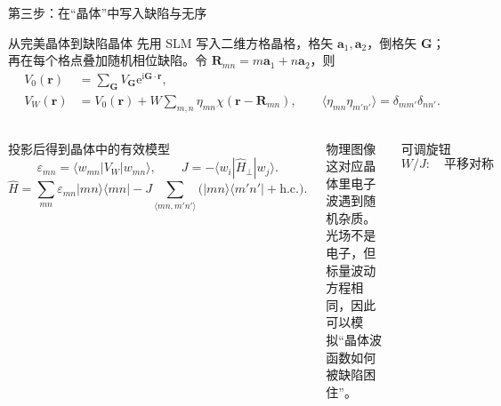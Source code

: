 \documentclass[UTF8,fontset=none,aspectratio=169,10pt]{ctexbeamer}
\newcommand{\ii}{\mathrm{i}}
\newcommand{\ee}{\mathrm{e}}
\newcommand{\rb}{\mathbf{r}}
\newcommand{\ab}{\mathbf{a}}
\newcommand{\Gb}{\mathbf{G}}
\newcommand{\Rn}{\mathbf{R}_{mn}}
\begin{document}
\begin{frame}[t]{第三步：在“晶体”中写入缺陷与无序}
\footnotesize
\setlength{\abovedisplayskip}{3pt}
\setlength{\belowdisplayskip}{3pt}
\begin{block}{从完美晶体到缺陷晶体}
先用 SLM 写入二维方格晶格，格矢 $\ab_1,\ab_2$，倒格矢 $\Gb$；再在每个格点叠加随机相位缺陷。令 $\Rn=m\ab_1+n\ab_2$，则
\[
\begin{aligned}
V_0(\rb)&=\sum_{\Gb}V_{\Gb}\ee^{\ii\Gb\cdot\rb},\\
V_W(\rb)&=V_0(\rb)+
W\sum_{m,n}\eta_{mn}\chi(\rb-\Rn),\qquad
\langle\eta_{mn}\eta_{m'n'}\rangle=\delta_{mm'}\delta_{nn'} .
\end{aligned}
\]
\end{block}

\vspace{-0.15em}
\begin{columns}[T,onlytextwidth]
\begin{block}{投影后得到晶体中的有效模型}
\[
\varepsilon_{mn}=\langle w_{mn}|V_W|w_{mn}\rangle,\qquad
J=-\langle w_i|\hat H_{\perp}|w_j\rangle .
\]
\[
\hat H=
\sum_{mn}\varepsilon_{mn}|mn\rangle\langle mn|
-J\sum_{\langle mn,m'n'\rangle}
\bigl(|mn\rangle\langle m'n'|+\mathrm{h.c.}\bigr).
\]
\end{block}

\begin{alertblock}{物理图像}
这对应晶体里电子波遇到随机杂质。光场不是电子，但标量波动方程相同，因此可以模拟“晶体波函数如何被缺陷困住”。
\end{alertblock}

\begin{block}{可调旋钮}
\[
W/J:\quad
\text{平移对称性破缺强度}
\]
\end{block}
\end{columns}
\end{frame}
\end{document}
